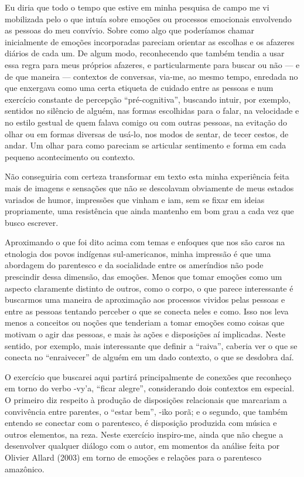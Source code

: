 Eu diria que todo o tempo que estive em minha pesquisa de campo me vi
mobilizada pelo o que intuía sobre emoções ou processos emocionais
envolvendo as pessoas do meu convívio. Sobre como algo que poderíamos
chamar inicialmente de emoções incorporadas pareciam orientar as
escolhas e os afazeres diários de cada um. De algum modo, reconhecendo
que também tendia a usar essa regra para meus próprios afazeres, e
particularmente para buscar ou não --- e de que maneira --- contextos de
conversas, via-me, ao mesmo tempo, enredada no que enxergava como uma
certa etiqueta de cuidado entre as pessoas e num exercício constante de
percepção ``pré-cognitiva'', buscando intuir, por exemplo, sentidos no
silêncio de alguém, nas formas escolhidas para o falar, na velocidade e
no estilo gestual de quem falava comigo ou com outras pessoas, na
evitação do olhar ou em formas diversas de usá-lo, nos modos de sentar,
de tecer cestos, de andar. Um olhar para como pareciam se articular
sentimento e forma em cada pequeno acontecimento ou contexto.

Não conseguiria com certeza transformar em texto esta minha experiência
feita mais de imagens e sensações que não se descolavam obviamente de
meus estados variados de humor, impressões que vinham e iam, sem se
fixar em ideias propriamente, uma resistência que ainda mantenho em bom
grau a cada vez que busco escrever.

Aproximando o que foi dito acima com temas e enfoques que nos são caros
na etnologia dos povos indígenas sul-americanos, minha impressão é que
uma abordagem do parentesco e da socialidade entre os ameríndios não
pode prescindir dessa dimensão, das emoções. Menos que tomar emoções
como um aspecto claramente distinto de outros, como o corpo, o que
parece interessante é buscarmos uma maneira de aproximação aos
processos vividos pelas pessoas e entre as pessoas tentando perceber o
que se conecta neles e como. Isso nos leva menos a conceitos ou noções
que tenderiam a tomar emoções como coisas que motivam o agir das
pessoas, e mais às ações e disposições aí implicadas. Neste sentido,
por exemplo, mais interessante que definir a ``raiva'', caberia ver o que
se conecta no ``enraivecer'' de alguém em um dado contexto, o que se
desdobra daí.

O exercício que buscarei aqui partirá principalmente de conexões que
reconheço em torno do verbo -vy’a, ``ficar alegre'', considerando dois
contextos em especial. O primeiro diz respeito à produção de
disposições relacionais que marcariam a convivência entre parentes, o
``estar bem'', -iko porã; e o segundo, que também entendo se conectar com
o parentesco, é disposição produzida com música e outros elementos, na
reza. Neste exercício inspiro-me, ainda que não chegue a desenvolver
qualquer diálogo com o autor, em momentos da análise feita por Olivier
Allard (2003) em torno de emoções e relações para o parentesco
amazônico.

